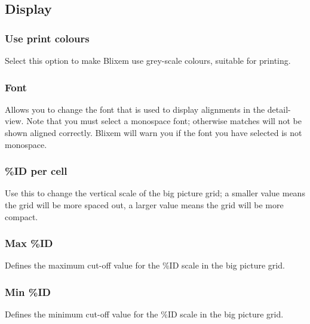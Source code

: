 \documentclass[letterpaper]{article}
\begin{document}
\bigskip

{\color[rgb]{0.30980393,0.5058824,0.7411765}\subsection[Display]{Display}}
\hypertarget{RefHeading2421056909880}{}
{\color[rgb]{0.30980393,0.5058824,0.7411765}\subsubsection[Use print colours]{Use print colours}}
\hypertarget{RefHeading2641056909880}{}
Select this option to make Blixem use grey-scale colours, suitable for printing.

\bigskip

{\color[rgb]{0.30980393,0.5058824,0.7411765}\subsubsection[Font]{Font}}
\hypertarget{RefHeading2441056909880}{}
Allows you to change the font that is used to display alignments in the detail-view. Note that you must select a monospace font; otherwise matches will not be shown aligned correctly. Blixem will warn you if the font you have selected is not monospace.

\bigskip

{\color[rgb]{0.30980393,0.5058824,0.7411765}\subsubsection[\%ID per cell]{\%ID per cell}}
\hypertarget{RefHeading2561056909880}{}
Use this to change the vertical scale of the big picture grid; a smaller value means the grid will be more spaced out, a larger value means the grid will be more compact.

\bigskip

{\color[rgb]{0.30980393,0.5058824,0.7411765}\subsubsection[Max \%ID]{Max \%ID}}
\hypertarget{RefHeading2581056909880}{}
Defines the maximum cut-off value for the \%ID scale in the big picture grid.

\bigskip

{\color[rgb]{0.30980393,0.5058824,0.7411765}\subsubsection[Min \%ID]{Min \%ID}}
\hypertarget{RefHeading2601056909880}{}
Defines the minimum cut-off value for the \%ID scale in the big picture grid.
\end{document}
